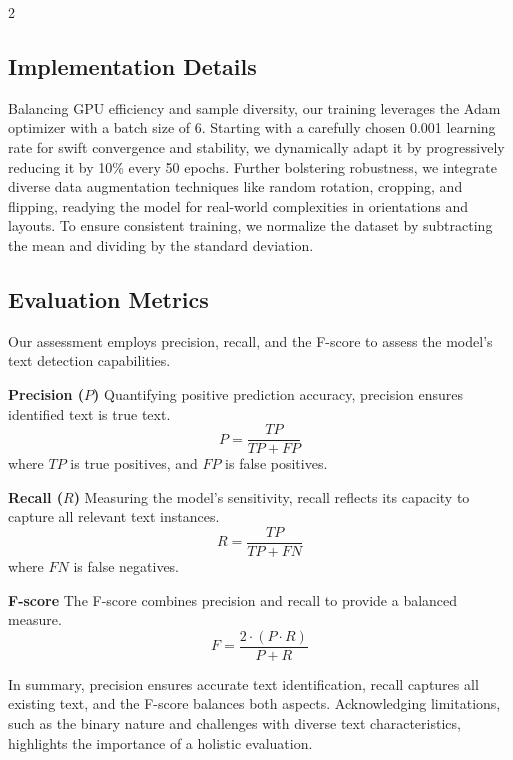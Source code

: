 \documentclass[sn-mathphys,Numbered]{sn-jnl}%
\begin{document}
\begin{multicols}{2}
\subsection{Implementation Details}
Balancing GPU efficiency and sample diversity, our training leverages the Adam optimizer with a batch size of 6. Starting with a carefully chosen 0.001 learning rate for swift convergence and stability, we dynamically adapt it by progressively reducing it by 10\% every 50 epochs. Further bolstering robustness, we integrate diverse data augmentation techniques like random rotation, cropping, and flipping, readying the model for real-world complexities in orientations and layouts. To ensure consistent training, we normalize the dataset by subtracting the mean and dividing by the standard deviation.


\subsection{Evaluation Metrics}

Our assessment employs precision, recall, and the F-score to assess the model's text detection capabilities.

\textbf{Precision (\(P\))}
Quantifying positive prediction accuracy, precision ensures identified text is true text. 
\begin{equation}
	P = \frac{TP}{TP + FP}
\end{equation} 
where \( TP \) is true positives, and \( FP \) is false positives.

\textbf{Recall (\(R\))}
Measuring the model's sensitivity, recall reflects its capacity to capture all relevant text instances.
\begin{equation}
	R = \frac{TP}{TP + FN}
\end{equation}
where \( FN \) is false negatives.
 
\textbf{F-score}
The F-score combines precision and recall to provide a balanced measure. 
\begin{equation}
	F = \frac{2 \cdot (P \cdot R)}{P + R}
\end{equation}

In summary, precision ensures accurate text identification, recall captures all existing text, and the F-score balances both aspects. Acknowledging limitations, such as the binary nature and challenges with diverse text characteristics, highlights the importance of a holistic evaluation.



\end{multicols}
\end{document}
